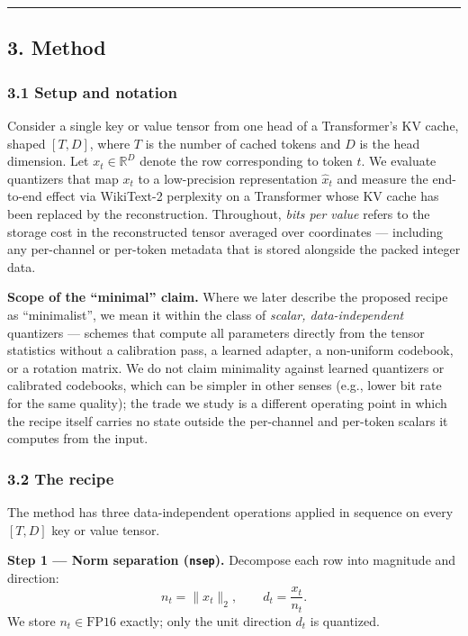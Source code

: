 \begin{center}\rule{0.5\linewidth}{0.5pt}\end{center}

\subsection{3. Method}\label{method}

\subsubsection{3.1 Setup and notation}\label{setup-and-notation}

Consider a single key or value tensor from one head of a Transformer's
KV cache, shaped \([T, D]\), where \(T\) is the number of cached tokens
and \(D\) is the head dimension. Let \(x_t \in \mathbb{R}^{D}\) denote
the row corresponding to token \(t\). We evaluate quantizers that map
\(x_t\) to a low-precision representation \(\hat{x}_t\) and measure the
end-to-end effect via WikiText-2 perplexity on a Transformer whose KV
cache has been replaced by the reconstruction. Throughout, \emph{bits
per value} refers to the storage cost in the reconstructed tensor
averaged over coordinates --- including any per-channel or per-token
metadata that is stored alongside the packed integer data.

\textbf{Scope of the ``minimal'' claim.} Where we later describe the
proposed recipe as ``minimalist'', we mean it within the class of
\emph{scalar, data-independent} quantizers --- schemes that compute all
parameters directly from the tensor statistics without a calibration
pass, a learned adapter, a non-uniform codebook, or a rotation matrix.
We do not claim minimality against learned quantizers or calibrated
codebooks, which can be simpler in other senses (e.g., lower bit rate
for the same quality); the trade we study is a different operating point
in which the recipe itself carries no state outside the per-channel and
per-token scalars it computes from the input.

\subsubsection{3.2 The recipe}\label{the-recipe}

The method has three data-independent operations applied in sequence on
every \([T, D]\) key or value tensor.

\textbf{Step 1 --- Norm separation (\texttt{nsep}).} Decompose each row
into magnitude and direction: \[
n_t = \|x_t\|_2,\qquad d_t = \frac{x_t}{n_t}.
\] We store \(n_t \in \text{FP16}\) exactly; only the unit direction
\(d_t\) is quantized.

